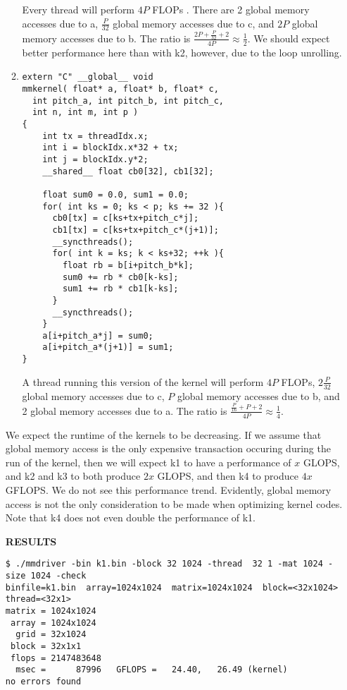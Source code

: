 \documentclass[11pt]{article}
\begin{document}
\begin{enumerate}
\begin{enumerate}
Every thread will perform $4P$ FLOPs . There are 2 global memory accesses due to a, $\frac{P}{32}$ global memory accesses due to c, and $2P$ global memory accesses due to b. The ratio is $\frac{2P + \frac{P}{32} + 2}{4P} \approx \frac12$. We should expect better performance here than with k2, however, due to the loop unrolling.

\item
\begin{lstlisting}
extern "C" __global__ void
mmkernel( float* a, float* b, float* c,
  int pitch_a, int pitch_b, int pitch_c,
  int n, int m, int p )
{
    int tx = threadIdx.x;
    int i = blockIdx.x*32 + tx;
    int j = blockIdx.y*2;
    __shared__ float cb0[32], cb1[32];

    float sum0 = 0.0, sum1 = 0.0;
    for( int ks = 0; ks < p; ks += 32 ){
      cb0[tx] = c[ks+tx+pitch_c*j];
      cb1[tx] = c[ks+tx+pitch_c*(j+1)];
      __syncthreads();
      for( int k = ks; k < ks+32; ++k ){
        float rb = b[i+pitch_b*k];
        sum0 += rb * cb0[k-ks];
        sum1 += rb * cb1[k-ks];
      }
      __syncthreads();
    }
    a[i+pitch_a*j] = sum0;
    a[i+pitch_a*(j+1)] = sum1;
}
\end{lstlisting}				

A thread running this version of the kernel will perform $4P$ FLOPs, $2\frac{P}{32}$ global memory accesses due to c, $P$ global memory accesses due to b, and 2 global memory accesses due to a. The ratio is $\frac{\frac{P}{16} + P + 2}{4P}\approx\frac14$. 
\end{enumerate}

We expect the runtime of the kernels to be decreasing. If we assume that global memory access is the only expensive transaction occuring during the run of the kernel, then we will expect k1 to have a performance of $x$ GLOPS, and k2 and k3 to both produce $2x$ GLOPS, and then k4 to produce $4x$ GFLOPS. We do not see this performance trend. Evidently, global memory access is not the only consideration to be made when optimizing kernel codes. Note that k4 does not even double the performance of k1.

\textbf{RESULTS}
\begin{lstlisting}
$ ./mmdriver -bin k1.bin -block 32 1024 -thread  32 1 -mat 1024 -size 1024 -check
binfile=k1.bin  array=1024x1024  matrix=1024x1024  block=<32x1024>  thread=<32x1>
matrix = 1024x1024
 array = 1024x1024
  grid = 32x1024
 block = 32x1x1
 flops = 2147483648
  msec =      87996   GFLOPS =   24.40,   26.49 (kernel)
no errors found


\end{lstlisting}
\end{enumerate}
\end{document}
